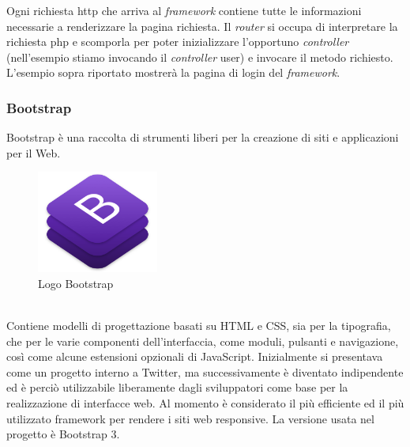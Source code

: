     Ogni richiesta http che arriva al \textit{framework} contiene tutte le informazioni necessarie a renderizzare la pagina richiesta. Il \textit{router} si occupa di interpretare la richiesta php e scomporla per poter inizializzare l'opportuno \textit{controller} (nell'esempio stiamo invocando il \textit{controller} user) e invocare il metodo richiesto.
    \\
    L'esempio sopra riportato mostrerà la pagina di login del \textit{framework}.

\subsubsection{Bootstrap}
Bootstrap è una raccolta di strumenti liberi per la creazione di siti e applicazioni per il Web.
\begin{figure}[!h] 
    \centering 
    \includegraphics[width=4cm]{immagini/loghi/bootstrap.png}
    \caption{Logo Bootstrap}
\end{figure}
\\
Contiene modelli di progettazione basati su HTML e CSS, sia per la tipografia,
che per le varie componenti dell'interfaccia, come moduli, pulsanti e navigazione,
così come alcune estensioni opzionali di JavaScript. Inizialmente si presentava come un progetto interno a Twitter, ma successivamente è diventato indipendente ed è perciò utilizzabile liberamente dagli sviluppatori come base per la realizzazione di interfacce web. Al momento è considerato il più efficiente ed il più utilizzato framework per rendere i siti web responsive. La versione usata nel progetto è Bootstrap 3.

